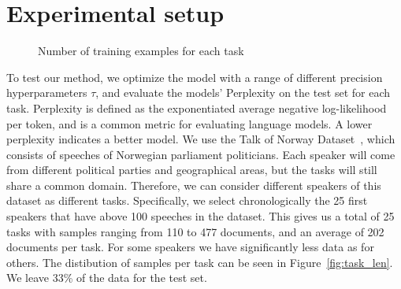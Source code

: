 \documentclass{article}
\begin{document}
\section{Experimental setup}
\begin{figure} \label{fig:task_len}
    \centering
    \caption{Number of training examples for each task}
\label{fig:training_lengths}
\end{figure}
To test our method, we optimize the model with a range of different precision hyperparameters $\tau$, and evaluate the models' Perplexity on the test set for each task.
Perplexity is defined as the exponentiated average negative log-likelihood per token, and is a common metric for evaluating language models. A lower perplexity indicates a better model.
We use the Talk of Norway Dataset~\cite{lapponi_talk_2018}, which consists of speeches of Norwegian parliament politicians.
Each speaker will come from different political parties and geographical areas, but the tasks will still share a common domain. 
Therefore, we can consider different speakers of this dataset as different tasks. Specifically, we select chronologically the 25 first speakers that have above 100 speeches in the dataset.
This gives us a total of 25 tasks with samples ranging from 110 to 477 documents, and an average of 202 documents per task. For some speakers we have significantly less data as for others. 
The distibution of samples per task can be seen in Figure~\ref{fig:task_len}.
We leave 33\% of the data for the test set.
\end{document}
